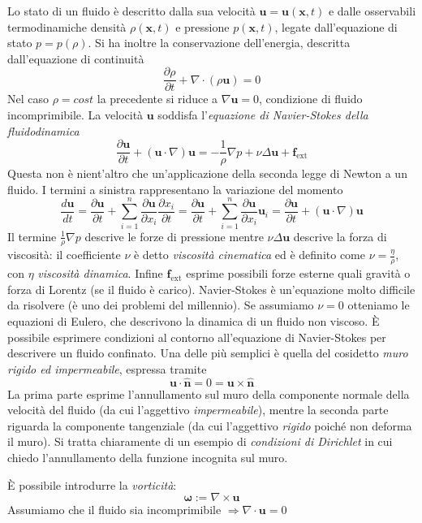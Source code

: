 \documentclass[a4paper,11pt]{report}
\newcommand{\vect}[1]{\boldsymbol{#1}}
\newcommand{\x}{\boldsymbol{x}}
\begin{document}
Lo stato di un fluido \`e descritto dalla sua velocit\`a $\vect{u}=\vect{u}(\x,t)$ e dalle osservabili termodinamiche densit\`a $\rho(\x, t)$ e pressione $p(\x,t)$, legate dall'equazione di stato $p=p(\rho)$.
Si ha inoltre la conservazione dell'energia, descritta dall'equazione di continuit\`a
\[
\frac{\partial \rho}{\partial t}+\nabla \cdot (\rho \vect{u})=0
\]
Nel caso $\rho=cost$ la precedente si riduce a $\nabla \vect{u}=0$, condizione di fluido incomprimibile.
La velocit\`a $\vect{u}$ soddisfa l'\emph{equazione di Navier-Stokes della fluidodinamica}
\[
\frac{\partial \vect{u}}{\partial t}+(\vect{u}\cdot \nabla) \vect{u}=-\frac{1}{\rho}\nabla p + \nu \Delta \vect{u} + \vect{f}_\text{ext}
\]
Questa non \`e nient'altro che un'applicazione della seconda legge di Newton a un fluido.
I termini a sinistra rappresentano la variazione del momento
\[
\frac{d \vect{u}}{d t} = \frac{\partial \vect{u}}{\partial t} + \sum_{i=1}^n \frac{\partial \vect{u}}{\partial x_i} \frac{\partial x_i}{\partial t} = \frac{\partial \vect{u}}{\partial t} + \sum_{i=1}^n \frac{\partial \vect{u}}{\partial x_i} \vect{u}_i=\frac{\partial \vect{u}}{\partial t}+(\vect{u}\cdot \nabla) \vect{u}
\]
Il termine $\frac{1}{\rho}\nabla p$ descrive le forze di pressione mentre $\nu \Delta \vect{u}$ descrive la forza di viscosit\`a:
il coefficiente $\nu$ \`e detto \emph{viscosit\`a cinematica} ed \`e definito come $\nu=\frac{\eta}{\rho}$, con $\eta$ \emph{viscosit\`a dinamica}.
Infine $\vect{f}_\text{ext}$ esprime possibili forze esterne quali gravit\`a o forza di Lorentz (se il fluido \`e carico).
Navier-Stokes \`e un'equazione molto difficile da risolvere (\`e uno dei problemi del millennio).
Se assumiamo $\nu=0$ otteniamo le equazioni di Eulero, che descrivono la dinamica di un fluido non viscoso.
\`E possibile esprimere condizioni al contorno all'equazione di Navier-Stokes per descrivere un fluido confinato.
Una delle pi\`u semplici \`e quella del cosidetto \emph{muro rigido ed impermeabile}, espressa tramite
\[
\vect{u}\cdot \hat{\vect{n}}=0=\vect{u}\times \hat{\vect{n}}
\]
La prima parte esprime l'annullamento sul muro della componente normale della velocit\`a del fluido (da cui l'aggettivo \emph{impermeabile}), mentre la seconda parte riguarda la componente tangenziale (da cui l'aggettivo \emph{rigido} poich\'e non deforma il muro).
Si tratta chiaramente di un esempio di \emph{condizioni di Dirichlet} in cui chiedo l'annullamento della funzione incognita sul muro.

\medskip

\`E possibile introdurre la \emph{vorticit\`a}:
\[
\vect{\omega}:=\nabla \times \vect{u}
\]
Assumiamo che il fluido sia incomprimibile $\Rightarrow \nabla \cdot \vect{u}=0$
\end{document}
